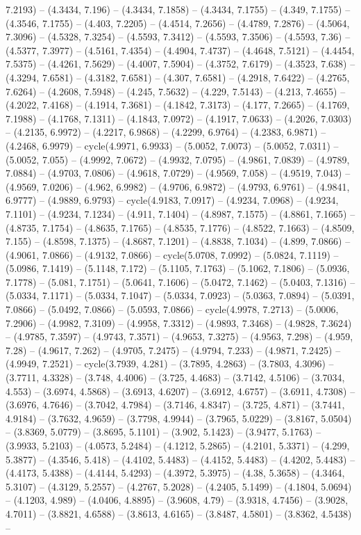 7.2193) -- (4.3434, 7.196) -- (4.3434, 7.1858) -- (4.3434, 7.1755) -- (4.349, 7.1755) -- (4.3546, 7.1755) -- (4.403, 7.2205) -- (4.4514, 7.2656) -- (4.4789, 7.2876) -- (4.5064, 7.3096) -- (4.5328, 7.3254) -- (4.5593, 7.3412) -- (4.5593, 7.3506) -- (4.5593, 7.36) -- (4.5377, 7.3977) -- (4.5161, 7.4354) -- (4.4904, 7.4737) -- (4.4648, 7.5121) -- (4.4454, 7.5375) -- (4.4261, 7.5629) -- (4.4007, 7.5904) -- (4.3752, 7.6179) -- (4.3523, 7.638) -- (4.3294, 7.6581) -- (4.3182, 7.6581) -- (4.307, 7.6581) -- (4.2918, 7.6422) -- (4.2765, 7.6264) -- (4.2608, 7.5948) -- (4.245, 7.5632) -- (4.229, 7.5143) -- (4.213, 7.4655) -- (4.2022, 7.4168) -- (4.1914, 7.3681) -- (4.1842, 7.3173) -- (4.177, 7.2665) -- (4.1769, 7.1988) -- (4.1768, 7.1311) -- (4.1843, 7.0972) -- (4.1917, 7.0633) -- (4.2026, 7.0303) -- (4.2135, 6.9972) -- (4.2217, 6.9868) -- (4.2299, 6.9764) -- (4.2383, 6.9871) -- (4.2468, 6.9979) -- cycle(4.9971, 6.9933) -- (5.0052, 7.0073) -- (5.0052, 7.0311) -- (5.0052, 7.055) -- (4.9992, 7.0672) -- (4.9932, 7.0795) -- (4.9861, 7.0839) -- (4.9789, 7.0884) -- (4.9703, 7.0806) -- (4.9618, 7.0729) -- (4.9569, 7.058) -- (4.9519, 7.043) -- (4.9569, 7.0206) -- (4.962, 6.9982) -- (4.9706, 6.9872) -- (4.9793, 6.9761) -- (4.9841, 6.9777) -- (4.9889, 6.9793) -- cycle(4.9183, 7.0917) -- (4.9234, 7.0968) -- (4.9234, 7.1101) -- (4.9234, 7.1234) -- (4.911, 7.1404) -- (4.8987, 7.1575) -- (4.8861, 7.1665) -- (4.8735, 7.1754) -- (4.8635, 7.1765) -- (4.8535, 7.1776) -- (4.8522, 7.1663) -- (4.8509, 7.155) -- (4.8598, 7.1375) -- (4.8687, 7.1201) -- (4.8838, 7.1034) -- (4.899, 7.0866) -- (4.9061, 7.0866) -- (4.9132, 7.0866) -- cycle(5.0708, 7.0992) -- (5.0824, 7.1119) -- (5.0986, 7.1419) -- (5.1148, 7.172) -- (5.1105, 7.1763) -- (5.1062, 7.1806) -- (5.0936, 7.1778) -- (5.081, 7.1751) -- (5.0641, 7.1606) -- (5.0472, 7.1462) -- (5.0403, 7.1316) -- (5.0334, 7.1171) -- (5.0334, 7.1047) -- (5.0334, 7.0923) -- (5.0363, 7.0894) -- (5.0391, 7.0866) -- (5.0492, 7.0866) -- (5.0593, 7.0866) -- cycle(4.9978, 7.2713) -- (5.0006, 7.2906) -- (4.9982, 7.3109) -- (4.9958, 7.3312) -- (4.9893, 7.3468) -- (4.9828, 7.3624) -- (4.9785, 7.3597) -- (4.9743, 7.3571) -- (4.9653, 7.3275) -- (4.9563, 7.298) -- (4.959, 7.28) -- (4.9617, 7.262) -- (4.9705, 7.2475) -- (4.9794, 7.233) -- (4.9871, 7.2425) -- (4.9949, 7.2521) -- cycle(3.7939, 4.281) -- (3.7895, 4.2863) -- (3.7803, 4.3096) -- (3.7711, 4.3328) -- (3.748, 4.4006) -- (3.725, 4.4683) -- (3.7142, 4.5106) -- (3.7034, 4.553) -- (3.6974, 4.5868) -- (3.6913, 4.6207) -- (3.6912, 4.6757) -- (3.6911, 4.7308) -- (3.6976, 4.7646) -- (3.7042, 4.7984) -- (3.7146, 4.8347) -- (3.725, 4.871) -- (3.7441, 4.9184) -- (3.7632, 4.9659) -- (3.7798, 4.9944) -- (3.7965, 5.0229) -- (3.8167, 5.0504) -- (3.8369, 5.0779) -- (3.8695, 5.1101) -- (3.902, 5.1423) -- (3.9477, 5.1763) -- (3.9933, 5.2103) -- (4.0573, 5.2484) -- (4.1212, 5.2865) -- (4.2101, 5.3371) -- (4.299, 5.3877) -- (4.3546, 5.418) -- (4.4102, 5.4483) -- (4.4152, 5.4483) -- (4.4202, 5.4483) -- (4.4173, 5.4388) -- (4.4144, 5.4293) -- (4.3972, 5.3975) -- (4.38, 5.3658) -- (4.3464, 5.3107) -- (4.3129, 5.2557) -- (4.2767, 5.2028) -- (4.2405, 5.1499) -- (4.1804, 5.0694) -- (4.1203, 4.989) -- (4.0406, 4.8895) -- (3.9608, 4.79) -- (3.9318, 4.7456) -- (3.9028, 4.7011) -- (3.8821, 4.6588) -- (3.8613, 4.6165) -- (3.8487, 4.5801) -- (3.8362, 4.5438) -- 